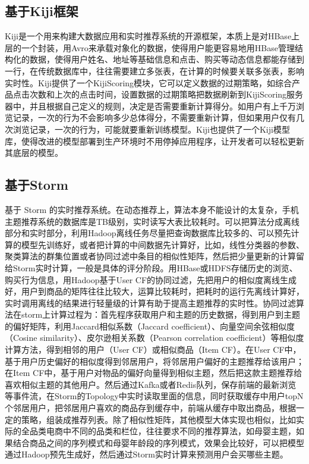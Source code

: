     \subsection{基于Kiji框架}
    Kiji是一个用来构建大数据应用和实时推荐系统的开源框架，本质上是对HBase上层的一个封装，用Avro来承载对象化的数据，使得用户能更容易地用HBase管理结构化的数据，使得用户姓名、地址等基础信息和点击、购买等动态信息都能存储到一行，在传统数据库中，往往需要建立多张表，在计算的时候要关联多张表，影响实时性。Kiji提供了一个KijiScoring模块，它可以定义数据的过期策略，如综合产品点击次数和上次的点击时间，设置数据的过期策略把数据刷新到KijiScoring服务器中，并且根据自己定义的规则，决定是否需要重新计算得分。如用户有上千万浏览记录，一次的行为不会影响多少总体得分，不需要重新计算，但如果用户仅有几次浏览记录，一次的行为，可能就要重新训练模型。Kiji也提供了一个Kiji模型库，使得改进的模型部署到生产环境时不用停掉应用程序，让开发者可以轻松更新其底层的模型。

    \subsection{基于Storm}
    基于 Storm 的实时推荐系统。在动态推荐上，算法本身不能设计的太复杂，手机主题推荐系统的数据库是TB级别，实时读写大表比较耗时。可以把算法分成离线部分和实时部分，利用Hadoop离线任务尽量把查询数据库比较多的、可以预先计算的模型先训练好，或者把计算的中间数据先计算好，比如，线性分类器的参数、聚类算法的群集位置或者协同过滤中条目的相似性矩阵，然后把少量更新的计算留给Storm实时计算，一般是具体的评分阶段。用HBase或HDFS存储历史的浏览、购买行为信息，用Hadoop基于User CF的协同过滤，先把用户的相似度离线生成好，用户到商品的矩阵往往比较大，运算比较耗时，把耗时的运行先离线计算好，实时调用离线的结果进行轻量级的计算有助于提高主题推荐的实时性。协同过滤算法在storm上计算过程为：首先程序获取用户和主题的历史数据，得到用户到主题的偏好矩阵，利用Jaccard相似系数（Jaccard coefficient）、向量空间余弦相似度（Cosine similarity）、皮尔逊相关系数（Pearson correlation coefficient）等相似度计算方法，得到相邻的用户（User CF）或相似商品（Item CF）。在User CF中，基于用户历史偏好的相似度得到邻居用户，将邻居用户偏好的主题推荐给该用户；在Item CF中，基于用户对物品的偏好向量得到相似主题，然后把这款主题推荐给喜欢相似主题的其他用户。然后通过Kafka或者Redis队列，保存前端的最新浏览等事件流，在Storm的Topology中实时读取里面的信息，同时获取缓存中用户topN个邻居用户，把邻居用户喜欢的商品存到缓存中，前端从缓存中取出商品，根据一定的策略，组装成推荐列表。除了相似性矩阵，其他模型大体实现也相似，比如实际的全品类电商中不同的品类和栏位，往往要求不同的推荐算法，如母婴主题，如果结合商品之间的序列模式和母婴年龄段的序列模式，效果会比较好，可以把模型通过Hadoop预先生成好，然后通过Storm实时计算来预测用户会买哪些主题。

